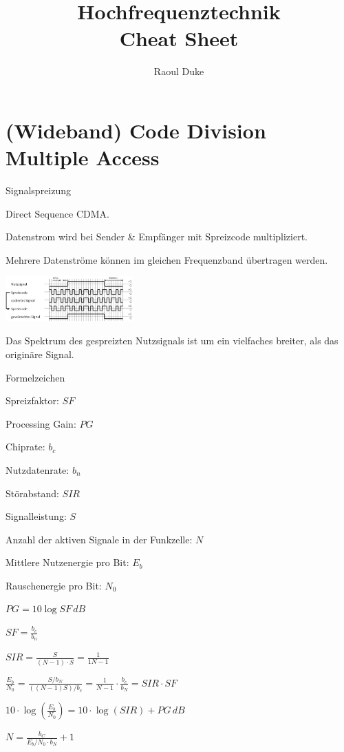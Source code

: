 \documentclass[german]{latex4ei/latex4ei_sheet}
\title{Hochfrequenztechnik \\ Cheat Sheet}
\author{Raoul Duke}
\begin{document}
\maketitle

\section{(Wideband) Code Division Multiple Access}
    \begin{sectionbox}
        \begin{bluebox}{Signalspreizung}
            \item Direct Sequence CDMA.
            \item Datenstrom wird bei Sender \& Empfänger mit Spreizcode multipliziert.
            \item Mehrere Datenströme können im gleichen Frequenzband übertragen werden.
            \item \includegraphics[width=185px]{img/Signalspreizung.png}
            \item Das Spektrum des gespreizten Nutzsignals ist um ein vielfaches breiter, als das originäre Signal. 
        \end{bluebox}
        \begin{symbolbox}{Formelzeichen}
            \item Spreizfaktor: $SF$
            \item Processing Gain: $PG$
            \item Chiprate: $b_c$
            \item Nutzdatenrate: $b_n$
            \item Störabstand: $SIR$
            \item Signalleistung: $S$
            \item Anzahl der aktiven Signale in der Funkzelle: $N$
            \item Mittlere Nutzenergie pro Bit: $E_b$
            \item Rauschenergie pro Bit: $N_0$
        \end{symbolbox}
        
        \begin{bluebox}
            \item $PG = 10\log SF\,dB$
            \item $SF = \frac{b_c}{b_n}$
            \item $SIR = \frac{S}{(N-1)\cdot S}= \frac{1}{1 N-1}$
            \item $\frac{E_b}{N_0} = \frac{S/b_N}{((N-1)S)/b_c} = \frac{1}{N-1}\cdot \frac{b_c}{b_N} = SIR \cdot SF$
            \item $10 \cdot \log \left(\frac{E_b}{N_0}\right) = 10\cdot \log (SIR)+ PG\,dB$
            \item $N = \frac{b_C}{E_b/N_0\cdot b_N}+1$
        \end{bluebox}
    \end{sectionbox}
\vspace{4cm}
\end{document}
